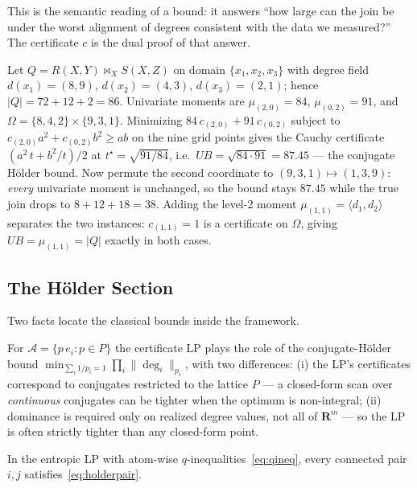 \noindent This is the semantic reading of a bound: it answers ``how
large can the join be under the worst alignment of degrees consistent
with the data we measured?''  The certificate $c$ is the dual
proof of that answer.

\begin{example}
\label{ex:three}
Let $Q = R(X,Y) \Join_X S(X,Z)$ on domain $\{x_1,x_2,x_3\}$ with
degree field $d(x_1) = (8,9)$, $d(x_2) = (4,3)$, $d(x_3) = (2,1)$;
hence $|Q| = 72 + 12 + 2 = 86$.  Univariate moments are
$\mu_{(2,0)} = 84$, $\mu_{(0,2)} = 91$, and
$\Omega = \{8,4,2\}\times\{9,3,1\}$.  Minimizing
$84\,c_{(2,0)} + 91\,c_{(0,2)}$ subject to
$c_{(2,0)}a^2 + c_{(0,2)}b^2 \ge ab$ on the nine grid points gives
the Cauchy certificate $(a^2\,t + b^2/t)/2$ at
$t^\star = \sqrt{91/84}$, i.e.\ $UB = \sqrt{84\cdot91} = 87.45$
--- the conjugate H\"older bound.  Now permute the second coordinate
to $(9,3,1) \mapsto (1,3,9)$: \emph{every} univariate moment is
unchanged, so the bound stays $87.45$ while the true join drops to
$8{+}12{+}18 = 38$.  Adding the level-2 moment
$\mu_{(1,1)} = \langle d_1,d_2\rangle$ separates the two instances:
$c_{(1,1)} = 1$ is a certificate on $\Omega$, giving $UB = \mu_{(1,1)}
= |Q|$ exactly in both cases.
\end{example}

\subsection{The H\"older Section}
\label{sec:holder}

Two facts locate the classical bounds inside the framework.

\begin{proposition}[Univariate moments $=$ H\"older, up to the exponent lattice]
\label{prop:holder}
For $\mathcal{A} = \{p\,e_i : p \in P\}$ the certificate LP plays the
role of the conjugate-H\"older bound
$\min_{\sum_i 1/p_i = 1} \prod_i \|\deg_i\|_{p_i}$, with two
differences: (i) the LP's certificates correspond to conjugates
restricted to the lattice $P$ --- a closed-form scan over
\emph{continuous} conjugates can be tighter when the optimum is
non-integral; (ii) dominance is required only on realized degree
values, not all of $\mathbf{R}^m$ --- so the LP is often strictly
tighter than any closed-form point.
\end{proposition}

\begin{proposition}
\label{prop:implied}
In the entropic LP with atom-wise $q$-inequalities~\eqref{eq:qineq},
every connected pair $i,j$ satisfies~\eqref{eq:holderpair}.
\end{proposition}

